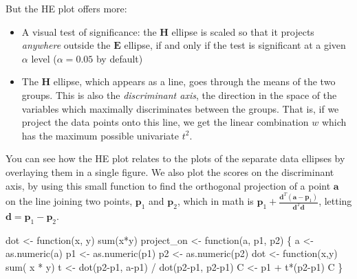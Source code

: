 \documentclass[
  letterpaper,
  10pt,
  krantz2]{krantz}
\makeatletter
\newenvironment{Shaded}{\begin{snugshade}}{\end{snugshade}}
\newcommand{\ControlFlowTok}[1]{\textcolor[rgb]{0.00,0.23,0.31}{#1}}
\newcommand{\FunctionTok}[1]{\textcolor[rgb]{0.28,0.35,0.67}{#1}}
\newcommand{\NormalTok}[1]{\textcolor[rgb]{0.00,0.23,0.31}{#1}}
\newcommand{\OtherTok}[1]{\textcolor[rgb]{0.00,0.23,0.31}{#1}}
\newcommand{\SpecialCharTok}[1]{\textcolor[rgb]{0.37,0.37,0.37}{#1}}
\newenvironment{kframe}{%
  \medskip{}
  \setlength{\fboxsep}{.8em}
  \def\at@end@of@kframe{}%
  \ifinner\ifhmode%
  \def\at@end@of@kframe{\end{minipage}}%
  \begin{minipage}{\columnwidth}%
  \fi\fi%
  \def\FrameCommand##1{\hskip\@totalleftmargin \hskip-\fboxsep
  \colorbox{shadecolor}{##1}\hskip-\fboxsep
      \hskip-\linewidth \hskip-\@totalleftmargin \hskip\columnwidth}%
  \MakeFramed {\advance\hsize-\width
    \@totalleftmargin\z@ \linewidth\hsize
    \@setminipage}}%
{\par\unskip\endMakeFramed%
  \at@end@of@kframe}
\renewenvironment{Shaded}{\begin{kframe}}{\end{kframe}}
\makeatother
\begin{document}
But the HE plot offers more:

\begin{itemize}
\item
  A visual test of significance: the \(\mathbf{H}\) ellipse is scaled so
  that it projects \emph{anywhere} outside the \(\mathbf{E}\) ellipse,
  if and only if the test is significant at a given \(\alpha\) level
  (\(\alpha = 0.05\) by default)
\item
  The \(\mathbf{H}\) ellipse, which appears as a line, goes through the
  means of the two groups. This is also the \emph{discriminant axis},
  the direction in the space of the variables which maximally
  discriminates between the groups. That is, if we project the data
  points onto this line, we get the linear combination \(w\) which has
  the maximum possible univariate \(t^2\).
\end{itemize}

You can see how the HE plot relates to the plots of the separate data
ellipses by overlaying them in a single figure. We also plot the scores
on the discriminant axis, by using this small function to find the
orthogonal projection of a point \(\mathbf{a}\) on the line joining two
points, \(\mathbf{p}_1\) and \(\mathbf{p}_2\), which in math is
\(\mathbf{p}_1 + \frac{\mathbf{d}^T (\mathbf{a} - \mathbf{p}_1)} {\mathbf{d}^T \mathbf{d}}\),
letting \(\mathbf{d} = \mathbf{p}_1 - \mathbf{p}_2\).

\begin{Shaded}
\begin{Highlighting}[]
\NormalTok{dot }\OtherTok{\textless{}{-}} \ControlFlowTok{function}\NormalTok{(x, y) }\FunctionTok{sum}\NormalTok{(x}\SpecialCharTok{*}\NormalTok{y)}
\NormalTok{project\_on }\OtherTok{\textless{}{-}} \ControlFlowTok{function}\NormalTok{(a, p1, p2) \{}
\NormalTok{    a }\OtherTok{\textless{}{-}} \FunctionTok{as.numeric}\NormalTok{(a)}
\NormalTok{    p1 }\OtherTok{\textless{}{-}} \FunctionTok{as.numeric}\NormalTok{(p1)}
\NormalTok{    p2 }\OtherTok{\textless{}{-}} \FunctionTok{as.numeric}\NormalTok{(p2)}
\NormalTok{    dot }\OtherTok{\textless{}{-}} \ControlFlowTok{function}\NormalTok{(x,y) }\FunctionTok{sum}\NormalTok{( x }\SpecialCharTok{*}\NormalTok{ y)    }
\NormalTok{    t }\OtherTok{\textless{}{-}} \FunctionTok{dot}\NormalTok{(p2}\SpecialCharTok{{-}}\NormalTok{p1, a}\SpecialCharTok{{-}}\NormalTok{p1) }\SpecialCharTok{/} \FunctionTok{dot}\NormalTok{(p2}\SpecialCharTok{{-}}\NormalTok{p1, p2}\SpecialCharTok{{-}}\NormalTok{p1)}
\NormalTok{    C }\OtherTok{\textless{}{-}}\NormalTok{ p1 }\SpecialCharTok{+}\NormalTok{ t}\SpecialCharTok{*}\NormalTok{(p2}\SpecialCharTok{{-}}\NormalTok{p1)}
\NormalTok{    C}
\NormalTok{\}}
\end{Highlighting}
\end{Shaded}
\end{document}
